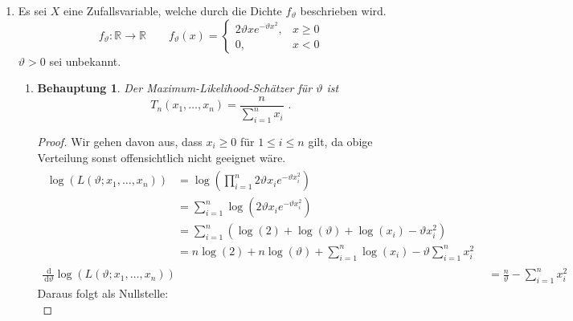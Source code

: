 \documentclass[a4paper]{scrartcl}
\newtheorem*{behaupt}{Behauptung}
\newcommand{\dif}{\ \mathrm{d}}
\def \blattnr {7}
\begin{document}
\begin{enumerate}[label=\bfseries \blattnr.\arabic*]
\item 
    Es sei $X$ eine Zufallsvariable, welche durch die Dichte $f_\vartheta$
    beschrieben wird.
    \begin{equation*}
        f_\vartheta \colon \mathbb{R} \to \mathbb{R}
        \qquad
        f_\vartheta (x) =
        \begin{cases}
            2 \vartheta x e^{-\vartheta x^2}, & x \geq 0 \\
            0, & x < 0
        \end{cases}
    \end{equation*}
    $\vartheta > 0$ sei unbekannt.
    \begin{enumerate}
        \item 
            \begin{behaupt}
                Der Maximum-Likelihood-Schätzer für $\vartheta$ ist
                \begin{equation*}
                    T_n(x_1, \dotsc, x_n) = \frac{n}{\sum_{i=1}^n x_i}
                    \text{ .}
                \end{equation*}
            \end{behaupt}
            \begin{proof}
                Wir gehen davon aus, dass $x_i \geq 0$ für $1 \leq i \leq n$
                gilt, da obige Verteilung sonst offensichtlich nicht geeignet
                wäre.
                \begin{align*}
                    \begin{split}
                        \log \left( L(\vartheta;x_1,\dotsc,x_n) \right)
                        &= \log \left( \prod_{i=1}^n 2\vartheta x_i e^{-\vartheta x_i^2} \right) \\
                        &= \sum_{i=1}^n \log \left( 2\vartheta x_i e^{-\vartheta x_i^2} \right) \\
                        &= \sum_{i=1}^n \left( \log(2) + \log(\vartheta) + \log(x_i) -\vartheta x_i^2 \right) \\
                        &= n\log(2) + n\log(\vartheta) + \sum_{i=1}^n \log(x_i) - \vartheta \sum_{i=1}^n x_i^2
                    \end{split} \\
                    \frac{\dif}{\dif\vartheta} \log \left( L(\vartheta;x_1,\dotsc,x_n) \right)
                    &= \frac{n}\vartheta - \sum_{i=1}^n x_i^2
                \end{align*}
                Daraus folgt als Nullstelle:
                \begin{equation*}

\end{equation*}
\end{proof}
\end{enumerate}
\end{enumerate}
\end{document}

